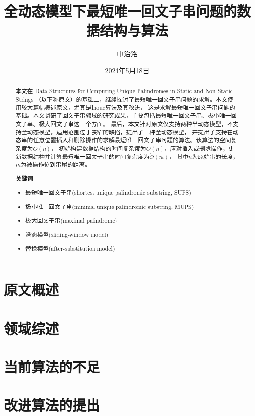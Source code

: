 \documentclass{ctexart}
\title{全动态模型下最短唯一回文子串问题的数据结构与算法}
\author{申治洺}
\date{2024年5月18日}
\begin{document}
    \maketitle

    \begin{abstract}
        本文在 Data Structures for Computing Unique Palindromes in Static and Non-Static Strings\cite{Mieno2024}
        （以下称原文）的基础上，继续探讨了最短唯一回文子串问题的求解。本文使用较大篇幅概述原文，尤其是Inoue算法\cite{INOUE2018122}及其改进，
        这是求解最短唯一回文子串问题的基础。本文调研了回文子串领域的研究成果，主要包括最短唯一回文子串、极小唯一回文子串、极大回文子串这三个方面。
        最后，本文针对原文仅支持两种半动态模型，不支持全动态模型，适用范围过于狭窄的缺陷，提出了一种全动态模型，
        并提出了支持在动态串的任意位置插入和删除操作的求解最短唯一回文子串问题的算法。该算法的空间复杂度为$O(n)$，
        初始构建数据结构的时间复杂度为$O(n)$，应对插入或删除操作，更新数据结构并计算最短唯一回文子串的时间复杂度为$\tilde{O}(m)$，
        其中$n$为原始串的长度，$m$为被操作位到串尾的距离。

        \textbf{关键词}
        \begin{itemize}
            \item 最短唯一回文子串(shortest unique palindromic substring, SUPS)
            \item 极小唯一回文子串(minimal unique palindromic substring, MUPS)
            \item 极大回文子串(maximal palindrome)
            \item 滑窗模型(sliding-window model)
            \item 替换模型(after-substitution model)
        \end{itemize}
    \end{abstract}
    
    \section{原文概述}\label{sec:1}
    

    \section{领域综述}\label{sec:2}
    

    \section{当前算法的不足}\label{sec:3}
    

    \section{改进算法的提出}\label{sec:4}
    

    
    
\end{document}
